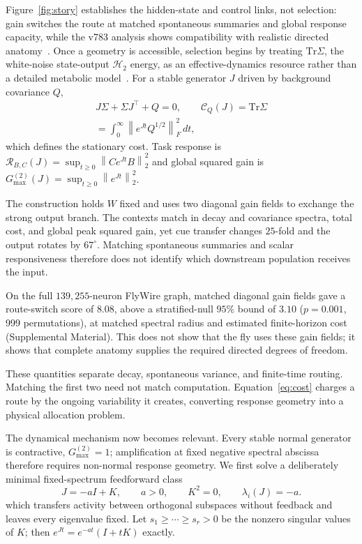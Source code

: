 \documentclass[
  aps,prl,reprint,superscriptaddress,nofootinbib,longbibliography,floatfix,
  amsmath,amssymb
]{revtex4-2}
\newcommand{\Tr}{\mathrm{Tr}}
\newcommand{\Gmax}{G_{\max}^{(2)}}
\newcommand{\Cnoise}{\mathcal C}
\newcommand{\Rtask}{\mathcal R}
\newcommand{\opnorm}[1]{\left\lVert #1\right\rVert_2}
\newcommand{\frobnorm}[1]{\left\lVert #1\right\rVert_F}
\begin{document}
Figure~\ref{fig:story} establishes the hidden-state and control links, not
selection: gain switches the route at matched spontaneous summaries and global
response capacity, while the v783 analysis shows compatibility with realistic
directed anatomy~\cite{shiu2024,dorkenwald2024,suppl}.  Once a geometry is
accessible, selection begins by treating $\Tr\Sigma$, the white-noise
state-output $\mathcal H_2$ energy, as an effective-dynamics resource rather
than a detailed metabolic model~\cite{attwell2001,hennequin2012,suppl}.  For a
stable generator $J$ driven by background covariance $Q$,
\begin{equation}
  \begin{aligned}
  J\Sigma+\Sigma J^\top+Q=0,
  \qquad
  \Cnoise_Q(J)=\Tr\Sigma
  \\
  =\int_0^\infty \frobnorm{e^{Jt}Q^{1/2}}^2\,dt ,
  \end{aligned}
  \label{eq:cost}
\end{equation}
which defines the stationary cost.  Task response is
$\Rtask_{B,C}(J)=\sup_{t\ge0}\opnorm{Ce^{Jt}B}^2$ and global squared gain is
$\Gmax(J)=\sup_{t\ge0}\opnorm{e^{Jt}}^2$.

The construction holds $W$ fixed and uses two diagonal gain fields to exchange
the strong output branch.  The contexts match in decay and covariance spectra,
total cost, and global peak squared gain, yet cue transfer changes $25$-fold and the
output rotates by $67^\circ$.  Matching spontaneous summaries and scalar
responsiveness therefore does not identify which downstream population receives
the input.

On the full $139{,}255$-neuron FlyWire graph, matched diagonal gain fields gave
a route-switch score of $8.08$, above a stratified-null $95\%$ bound of $3.10$
($p=0.001$, 999 permutations), at matched spectral radius and estimated
finite-horizon cost (Supplemental Material).  This does not show that the fly uses these gain
fields; it shows that complete anatomy supplies the required directed degrees
of freedom.

These quantities separate decay, spontaneous variance, and finite-time routing.
Matching the first two need not match computation.  Equation~\eqref{eq:cost}
charges a route by the ongoing variability it creates, converting response
geometry into a physical allocation problem.

The dynamical mechanism now becomes relevant.  Every stable normal generator
is contractive, $\Gmax=1$; amplification at fixed negative spectral abscissa
therefore requires non-normal response geometry.  We first solve a deliberately
minimal fixed-spectrum feedforward class
\begin{equation}
  J=-aI+K,\qquad a>0,\qquad K^2=0,
  \qquad \lambda_i(J)=-a .
  \label{eq:squarezero}
\end{equation}
which transfers activity between orthogonal subspaces without feedback and
leaves every eigenvalue fixed.  Let $s_1\ge\cdots\ge s_r>0$ be the nonzero
singular values of $K$; then $e^{Jt}=e^{-at}(I+tK)$ exactly.
\end{document}
